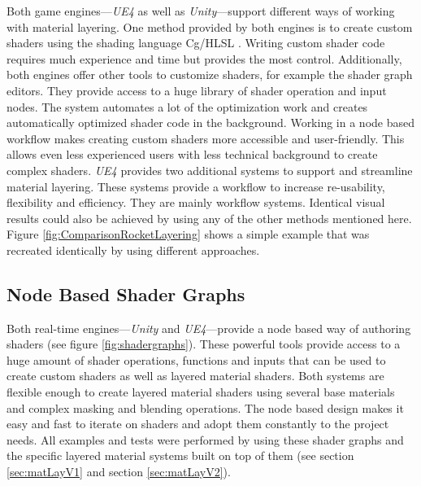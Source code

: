Both game engines---\emph{UE4} as well as \emph{Unity}---support different ways of working with material layering. One method provided by both engines is to create custom shaders using the shading language Cg/HLSL \cites{unity2017ShaderLanguague,epic2018shader}. Writing custom shader code requires much experience and time but provides the most control. Additionally, both engines offer other tools to customize shaders, for example the shader graph editors. They provide access to a huge library of shader operation and input nodes. The system automates a lot of the optimization work and creates automatically optimized shader code in the background. Working in a node based workflow makes creating custom shaders more accessible and user-friendly. This allows even less experienced users with less technical background to create complex shaders. \emph{UE4} provides two additional systems to support and streamline material layering. These systems provide a workflow to increase re-usability, flexibility and efficiency. They are mainly workflow systems. Identical visual results could also be achieved by using any of the other methods mentioned here. Figure \ref{fig:ComparisonRocketLayering} shows a simple example that was recreated identically by using different approaches.  

\subsection{Node Based Shader Graphs}
Both real-time engines---\emph{Unity} and \emph{UE4}---provide a node based way of authoring shaders (see figure \ref{fig:shadergraphs}). These powerful tools provide access to a huge amount of shader operations, functions and inputs that can be used to create custom shaders as well as layered material shaders. Both systems are flexible enough to create layered material shaders using several base materials and complex masking and blending operations. The node based design makes it easy and fast to iterate on shaders and adopt them constantly to the project needs. All examples and tests were performed by using these shader graphs and the specific layered material systems built on top of them (see section \ref{sec:matLayV1} and section \ref{sec:matLayV2}).  

